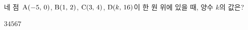 네 점~$\mathrm{A}(-5,\,0)$, $\mathrm{B}(1,\,2)$, $\mathrm{C}(3,\,4)$, $\mathrm{D}(k,\,16)$이 한 원 위에 있을 때, 양수 $k$의 값은?
\begin{choices32}{$3$}{$4$}{$5$}{$6$}{$7$}\end{choices32}
